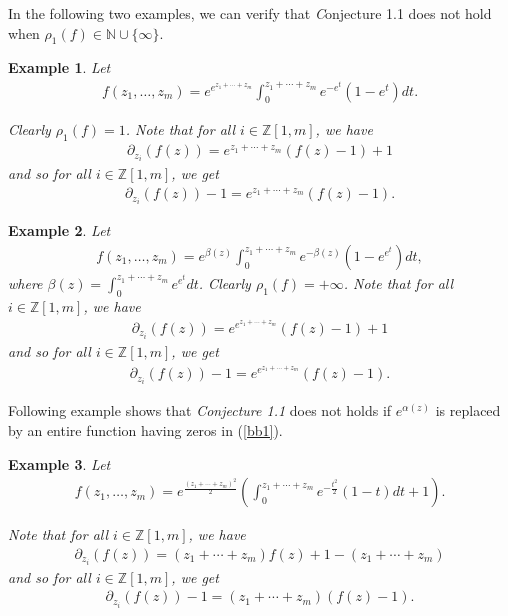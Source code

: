 \documentclass[11pt, reqno]{amsart}
\newtheorem{exm}{Example}[section]
\numberwithin{equation}{section}
\begin{document}
In the following two examples, we can verify that {\emph Conjecture 1.1} does not hold when $\rho_1(f)\in\mathbb{N}\cup\{\infty\}$.

\begin{exm} Let 
\begin{align*}
f(z_1,\ldots,z_m)=e^{e^{z_1+\cdots+z_m}}\int_{0}^{z_1+\cdots+z_m}e^{-e^t}(1-e^t)dt.
\end{align*}

Clearly $\rho_1(f)=1$. Note that for all $i\in\mathbb{Z}[1,m]$, we have
\begin{align*}
\partial_{z_i}(f(z))=e^{z_1+\cdots+z_m}(f(z)-1)+1
\end{align*}
and so for all $i\in\mathbb{Z}[1,m]$, we get
\begin{align*}
\partial_{z_i}(f(z))-1=e^{z_1+\cdots+z_m}(f(z)-1).
\end{align*}
\end{exm}

\begin{exm} Let
\begin{align*}
f(z_1,\ldots,z_m)=e^{\beta(z)}\int_{0}^{z_1+\cdots+z_m}e^{-\beta(z)}(1-e^{e^t})dt,
\end{align*}
where $\beta(z)=\int_{0}^{z_1+\cdots+z_m}e^{e^t}dt$. Clearly $\rho_1(f)=+\infty$. Note that for all $i\in\mathbb{Z}[1,m]$, we have
\begin{align*}
\partial_{z_i}(f(z))=e^{e^{z_1+\cdots+z_m}}(f(z)-1)+1
\end{align*}
and so for all $i\in\mathbb{Z}[1,m]$, we get
\begin{align*}
\partial_{z_i}(f(z))-1=e^{e^{z_1+\cdots+z_m}}(f(z)-1).
\end{align*}
\end{exm}

Following example shows that \emph{Conjecture 1.1} does not holds if $e^{\alpha(z)}$ is replaced by an entire function having zeros in 
(\ref{bb1}). 
\begin{exm} Let 
\begin{align*}
f(z_1,\ldots,z_m)=e^{\frac{(z_1+\cdots+z_m)^2}{2}}\left(\int_{0}^{z_1+\cdots+z_m}e^{-\frac{t^2}{2}}(1-t)dt+1\right).
\end{align*}

Note that for all $i\in\mathbb{Z}[1,m]$, we have
\begin{align*}
\partial_{z_i}(f(z))=(z_1+\cdots+z_m)f(z)+1-(z_1+\cdots+z_m)
\end{align*}
and so for all $i\in\mathbb{Z}[1,m]$, we get
\begin{align*}
\partial_{z_i}(f(z))-1=(z_1+\cdots+z_m)(f(z)-1).
\end{align*}
\end{exm}
\end{document}
